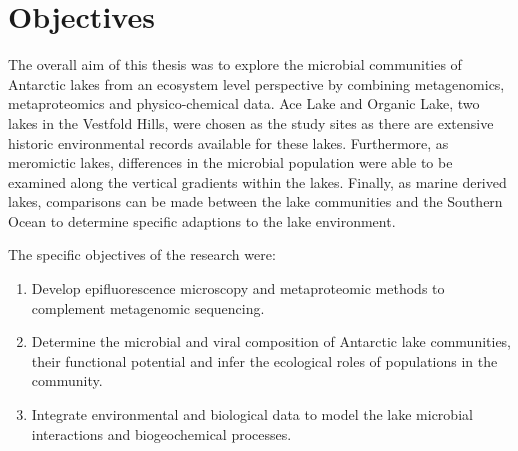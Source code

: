 

\section{Objectives}
The overall aim of this thesis was to explore the microbial communities of Antarctic lakes from an ecosystem level perspective by combining metagenomics, metaproteomics and physico-chemical data.
Ace Lake and Organic Lake, two lakes in the Vestfold Hills, were chosen as the study sites as there are extensive historic environmental records available for these lakes.
Furthermore, as meromictic lakes, differences in the microbial population were able to be examined along the vertical gradients within the lakes.
Finally, as marine derived lakes, comparisons can be made between the lake communities and the Southern Ocean to determine specific adaptions to the lake environment.

The specific objectives of the research were:

\begin{enumerate}
\item 
  Develop epifluorescence microscopy and metaproteomic methods to complement metagenomic sequencing.

\item
  Determine the microbial and viral composition of Antarctic lake communities, their functional potential and infer the ecological roles of populations in the community.

\item
  Integrate environmental and biological data to model the lake microbial interactions and biogeochemical processes.

\end{enumerate}
